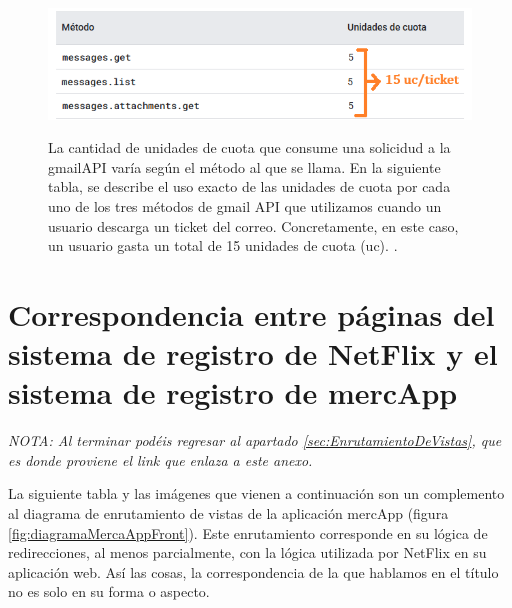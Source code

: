 \documentclass[a4paper,12pt]{report}
\begin{document}
	
	\FloatBarrier
	\setlength{\belowcaptionskip}{3pt}
	\begin{figure}[H]
		\centering
		\caption{La cantidad de unidades de cuota que consume una solicidud a la gmailAPI varía según el método al que se llama. En la siguiente tabla, se describe el uso exacto de las unidades de cuota por cada uno de los tres métodos de gmail API que utilizamos cuando un usuario descarga un ticket del correo. Concretamente, en este caso, un usuario gasta un total de 15 unidades de cuota (uc). \cite{gmail_api_quota}.}
		\includegraphics[width=1\linewidth]{img/quotesGoogleDevelopersUSADES}
		\label{fig:quotesGoogleDevelopersUSADES}
	\end{figure}
	\FloatBarrier
		
		
	
	\section{Correspondencia entre páginas del sistema de registro de NetFlix y el sistema de registro de mercApp}
	\label{sec:annexNetflix}

	\textit{NOTA: Al terminar podéis regresar al apartado  \ref{sec:EnrutamientoDeVistas}, que es donde proviene el link que enlaza a este anexo.} 
	
	La siguiente tabla y las imágenes que vienen a continuación son un complemento al diagrama de enrutamiento de vistas de la aplicación mercApp (figura \ref{fig:diagramaMercaAppFront}). Este enrutamiento corresponde en su lógica de redirecciones, al menos parcialmente, con la lógica utilizada por NetFlix en su aplicación web. Así las cosas, la correspondencia de la que hablamos en el título no es solo en su forma o aspecto.
	
\end{document}

